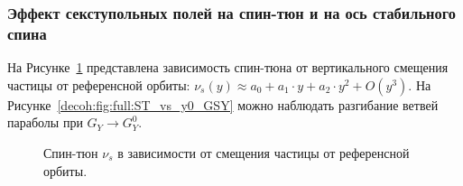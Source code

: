 \subsubsection{Эффект секступольных полей на спин-тюн и на ось стабильного спина}\label{par:Sextupole-effect-on-spin-tune-and-nbar}
На Рисунке~\ref{decoh:fig:ST_vs_y0_GSY} представлена зависимость спин-тюна от вертикального смещения частицы от референсной орбиты: $\nu_s(y) \approx a_0 + a_1\cdot y + a_2\cdot y^2 + O(y^3)$. На Рисунке~\ref{decoh:fig:full:ST_vs_y0_GSY} можно наблюдать разгибание ветвей параболы при $G_Y \rightarrow G_Y^0$.
\begin{figure}[H]
	\centering
\end{figure}
\begin{figure}[H]\centering
	\caption{Спин-тюн $\nu_s$ в зависимости от смещения частицы от референсной орбиты.\label{decoh:fig:ST_vs_y0_GSY}}
\end{figure}

